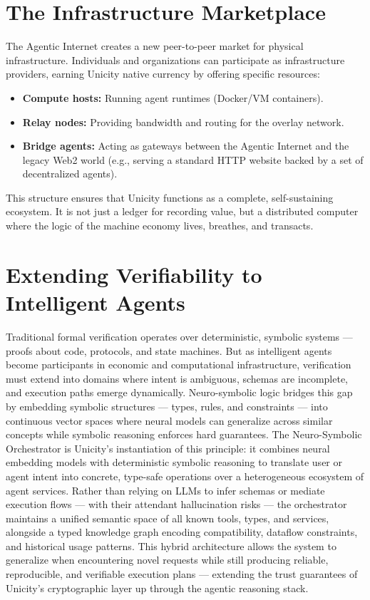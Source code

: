 \documentclass{article}
\begin{document}
\section{The Infrastructure Marketplace}

The Agentic Internet creates a new peer-to-peer market for physical infrastructure. Individuals and organizations can participate as infrastructure providers, earning Unicity native currency by offering specific resources:

\begin{itemize}
    \item \textbf{Compute hosts:}
    Running agent runtimes (Docker/VM containers).

    \item \textbf{Relay nodes:}
    Providing bandwidth and routing for the overlay network.

    \item \textbf{Bridge agents:}
    Acting as gateways between the Agentic Internet and the legacy Web2 world (e.g., serving a standard HTTP website backed by a set of decentralized agents).
\end{itemize}

This structure ensures that Unicity functions as a complete, self-sustaining ecosystem. It is not just a ledger for recording value, but a distributed computer where the logic of the machine economy lives, breathes, and transacts.

\section{Extending Verifiability to Intelligent Agents}

Traditional formal verification operates over deterministic, symbolic systems --- proofs about code, protocols, and state machines. But as intelligent agents become participants in economic and computational infrastructure, verification must extend into domains where intent is ambiguous, schemas are incomplete, and execution paths emerge dynamically. Neuro-symbolic logic bridges this gap by embedding symbolic structures --- types, rules, and constraints --- into continuous vector spaces where neural models can generalize across similar concepts while symbolic reasoning enforces hard guarantees. The Neuro-Symbolic Orchestrator is Unicity's instantiation of this principle: it combines neural embedding models with deterministic symbolic reasoning to translate user or agent intent into concrete, type-safe operations over a heterogeneous ecosystem of agent services. Rather than relying on LLMs to infer schemas or mediate execution flows --- with their attendant hallucination risks --- the orchestrator maintains a unified semantic space of all known tools, types, and services, alongside a typed knowledge graph encoding compatibility, dataflow constraints, and historical usage patterns. This hybrid architecture allows the system to generalize when encountering novel requests while still producing reliable, reproducible, and verifiable execution plans --- extending the trust guarantees of Unicity's cryptographic layer up through the agentic reasoning stack.
\end{document}
